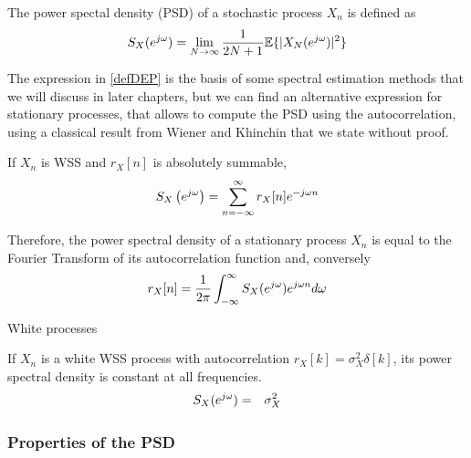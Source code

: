 \begin{definition}
The power spectal density (PSD) of a stochastic process $X_n$ is defined as
\begin{equation}
S_X(e^{j \omega}) = \lim_{N \rightarrow \infty} \frac{1}{2N+1} \mathbb{E}\{|X_N(e^{j \omega})|^2\}
\label{defDEP}
\end{equation}
\end{definition}

The expression in \eqref{defDEP} is the basis of some spectral estimation methods that we will discuss in later chapters, but we can find an alternative expression for stationary processes, that allows to compute the PSD using the autocorrelation, using a classical result from Wiener and Khinchin that we state without proof.

\begin{theorem}

If $X_n$ is WSS and $r_X[n]$ is absolutely summable, 
\begin{equation}
S_X\left(e^{j \omega}\right) = \sum_{n=-\infty}^{\infty} r_X[n] e^{-j \omega n}
\label{DEPEst}
\end{equation}

\end{theorem}

Therefore, the power spectral density of a stationary process $X_n$ is equal to the Fourier Transform of its autocorrelation function and, conversely
\begin{equation}\label{ec:dep2}
r_X[n] = \frac{1}{2\pi} \int_{-\infty}^\infty S_X(e^{j \omega}) e^{j \omega n} d\omega
\end{equation}


\begin{example}{White processes}

If $X_n$ is a white WSS process with autocorrelation $r_X[k]=\sigma_X^2\delta[k]$, its power spectral density is constant at all frequencies.
\begin{eqnarray}
S_X(e^{j \omega}) &=& \sigma_X^2
\end{eqnarray}
\end{example}

\subsubsection{Properties of the PSD}

